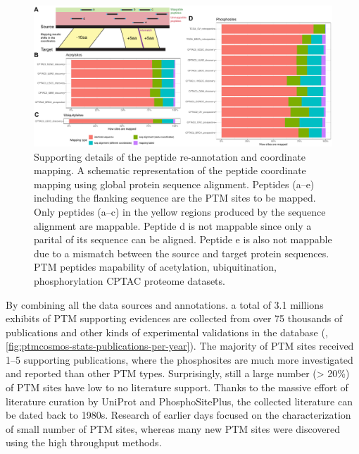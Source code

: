 \begin{figure}[tbp]
    \centering
    \includegraphics[width=\linewidth]{figures/chap03_ptmcosmos/figures1_mapping_stats.pdf}
    \caption[Supporting details of the peptide re-annotation and coordinate mapping.]{%
        Supporting details of the peptide re-annotation and coordinate mapping.
        A schematic representation of the peptide coordinate mapping using global protein sequence alignment. Peptides (a--e) including the flanking sequence are the PTM sites to be mapped. Only peptides (a--c) in the yellow regions produced by the sequence alignment are mappable. Peptide d is not mappable since only a parital of its sequence can be aligned. Peptide e is also not mappable due to a mismatch between the source and target protein sequences. PTM peptides mapability of  acetylation,
         ubiquitination,
         phosphorylation CPTAC proteome datasets.
    }
    \label{fig:ptmcosmos-map-stats}
\end{figure}

By combining all the data sources and annotations. a total of 3.1 millions exhibits of PTM supporting evidences are collected from over 75 thousands of publications and other kinds of experimental validations in the database (, \ref{fig:ptmcosmos-stats-publications-per-year}). The majority of PTM sites received 1--5 supporting publications, where the phosphosites are much more investigated and reported than other PTM types. Surprisingly, still a large number (> 20\%) of PTM sites have low to no literature support. Thanks to the massive effort of literature curation by UniProt and PhosphoSitePlus, the collected literature can be dated back to 1980s. Research of earlier days focused on the characterization of small number of PTM sites, whereas many new PTM sites were discovered using the high throughput methods.

